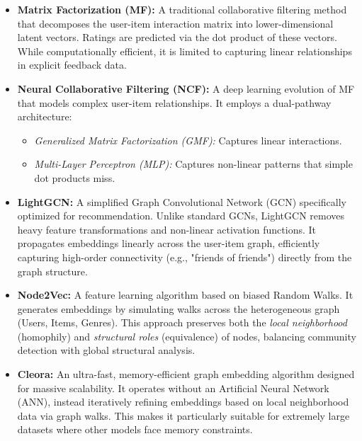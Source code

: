 \documentclass{article}
\begin{document}
\begin{itemize}
    \item \textbf{Matrix Factorization (MF):} A traditional collaborative filtering method that decomposes the user-item interaction matrix into lower-dimensional latent vectors. Ratings are predicted via the dot product of these vectors. While computationally efficient, it is limited to capturing linear relationships in explicit feedback data.
    
    \item \textbf{Neural Collaborative Filtering (NCF):} A deep learning evolution of MF that models complex user-item relationships. It employs a dual-pathway architecture:
    \begin{itemize}
        \item \textit{Generalized Matrix Factorization (GMF):} Captures linear interactions.
        \item \textit{Multi-Layer Perceptron (MLP):} Captures non-linear patterns that simple dot products miss.
    \end{itemize}
    
    \item \textbf{LightGCN:} A simplified Graph Convolutional Network (GCN) specifically optimized for recommendation. Unlike standard GCNs, LightGCN removes heavy feature transformations and non-linear activation functions. It propagates embeddings linearly across the user-item graph, efficiently capturing high-order connectivity (e.g., "friends of friends") directly from the graph structure.
    
    \item \textbf{Node2Vec:} A feature learning algorithm based on biased Random Walks. It generates embeddings by simulating walks across the heterogeneous graph (Users, Items, Genres). This approach preserves both the \textit{local neighborhood} (homophily) and \textit{structural roles} (equivalence) of nodes, balancing community detection with global structural analysis.
    
    \item \textbf{Cleora:} An ultra-fast, memory-efficient graph embedding algorithm designed for massive scalability. It operates without an Artificial Neural Network (ANN), instead iteratively refining embeddings based on local neighborhood data via graph walks. This makes it particularly suitable for extremely large datasets where other models face memory constraints.
\end{itemize}
\end{document}
